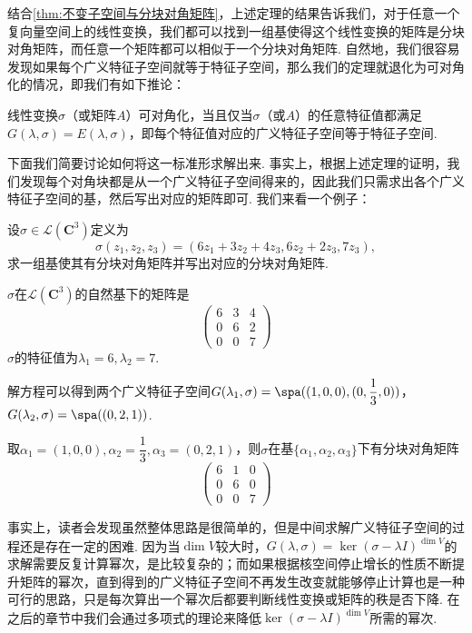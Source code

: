 结合\autoref{thm:不变子空间与分块对角矩阵}，上述定理的结果告诉我们，对于任意一个复向量空间上的线性变换，我们都可以找到一组基使得这个线性变换的矩阵是分块对角矩阵，而任意一个矩阵都可以相似于一个分块对角矩阵. 自然地，我们很容易发现如果每个广义特征子空间就等于特征子空间，那么我们的定理就退化为可对角化的情况，即我们有如下推论：
\begin{corollary}{}{}
    线性变换$\sigma$（或矩阵$A$）可对角化，当且仅当$\sigma$（或$A$）的任意特征值都满足$G(\lambda,\sigma)=E(\lambda,\sigma)$，即每个特征值对应的广义特征子空间等于特征子空间.
\end{corollary}

下面我们简要讨论如何将这一标准形求解出来. 事实上，根据上述定理的证明，我们发现每个对角块都是从一个广义特征子空间得来的，因此我们只需求出各个广义特征子空间的基，然后写出对应的矩阵即可. 我们来看一个例子：
\begin{example}{}{}
    设$\sigma\in \mathcal{L}(\mathbf{C}^3)$定义为
    \[\sigma(z_1,z_2,z_3)=(6z_1+3z_2+4z_3,6z_2+2z_3,7z_3),\]求一组基使其有分块对角矩阵并写出对应的分块对角矩阵.
\end{example}

\begin{solution}
    $\sigma$在$\mathcal{L}(\mathbf{C}^3)$的自然基下的矩阵是
    \[ \begin{pmatrix}
        6 & 3 & 4 \\
        0 & 6 & 2 \\
        0 & 0 & 7
    \end{pmatrix} \]
    $\sigma$的特征值为$\lambda_1=6,\lambda_2=7$.

    解方程可以得到两个广义特征子空间$G(\lambda_1,\sigma)=\spa((1,0,0),(0,\dfrac{1}{3},0))$，$G(\lambda_2,\sigma)=\spa((0,2,1))$.

    取$\alpha_1=(1,0,0),\alpha_2=\dfrac{1}{3},\alpha_3=(0,2,1)$，则$\sigma$在基$\{\alpha_1,\alpha_2,\alpha_3\}$下有分块对角矩阵
    \[ \begin{pmatrix}
        6 & 1 & 0 \\
        0 & 6 & 0 \\
        0 & 0 & 7
    \end{pmatrix} \]
\end{solution}

事实上，读者会发现虽然整体思路是很简单的，但是中间求解广义特征子空间的过程还是存在一定的困难. 因为当$\dim V$较大时，$G(\lambda,\sigma)=\ker (\sigma-\lambda I)^{\dim V}$的求解需要反复计算幂次，是比较复杂的；而如果根据核空间停止增长的性质不断提升矩阵的幂次，直到得到的广义特征子空间不再发生改变就能够停止计算也是一种可行的思路，只是每次算出一个幂次后都要判断线性变换或矩阵的秩是否下降. 在之后的章节中我们会通过多项式的理论来降低$\ker (\sigma-\lambda I)^{\dim V}$所需的幂次.

